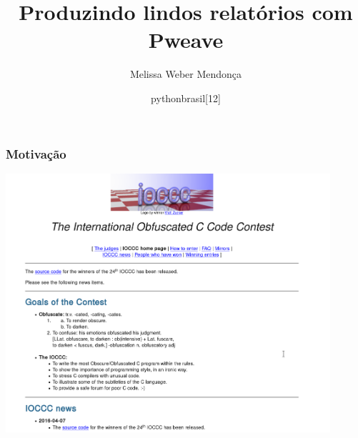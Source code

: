 \documentclass{beamer}
\title{Produzindo lindos relatórios com Pweave}
\author{Melissa Weber Mendonça}
\date{pythonbrasil[12]}
\begin{document}
{%
\begin{frame}%

   \titlepage%
   
 \end{frame}%
}

\begin{frame}
  \frametitle{Motivação}
  \begin{center}
    \includegraphics[width=0.9\textwidth]{figs/obfuscated.png}
  \end{center}
\end{frame}
\end{document}

